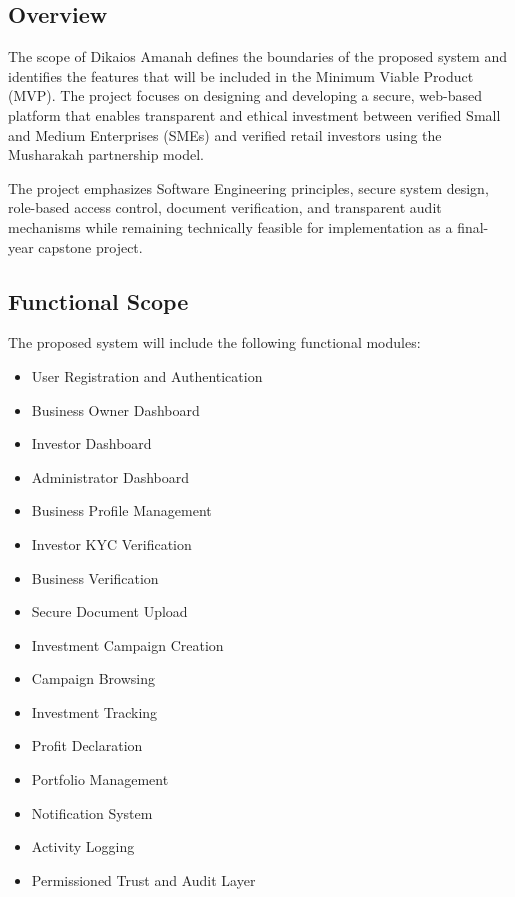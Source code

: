 \subsection{Overview}

The scope of Dikaios Amanah defines the boundaries of the proposed system and identifies the features that will be included in the Minimum Viable Product (MVP). The project focuses on designing and developing a secure, web-based platform that enables transparent and ethical investment between verified Small and Medium Enterprises (SMEs) and verified retail investors using the Musharakah partnership model.

The project emphasizes Software Engineering principles, secure system design, role-based access control, document verification, and transparent audit mechanisms while remaining technically feasible for implementation as a final-year capstone project.


\subsection{Functional Scope}

The proposed system will include the following functional modules:

\begin{itemize}

\item User Registration and Authentication

\item Business Owner Dashboard

\item Investor Dashboard

\item Administrator Dashboard

\item Business Profile Management

\item Investor KYC Verification

\item Business Verification

\item Secure Document Upload

\item Investment Campaign Creation

\item Campaign Browsing

\item Investment Tracking

\item Profit Declaration

\item Portfolio Management

\item Notification System

\item Activity Logging

\item Permissioned Trust and Audit Layer

\end{itemize}

